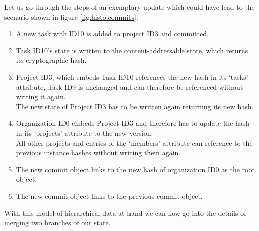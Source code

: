 Let us go through the steps of an exemplary update which could have lead to the scenario shown in figure \ref{fig:histo.commits}:

\begin{enumerate}
\item A new task with ID10 is added to project ID3 and committed.
\item Task ID10's state is written to the content-addressable store, which returns its cryptographic hash.
\item Project ID3, which embeds Task ID10 references the new hash in its `tasks' attribute, Task ID9 is unchanged and can therefore be referenced without writing it again.\\
The new state of Project ID3 has to be written again returning its new hash.
\item Organization ID0 embeds Project ID3 and therefore has to update the hash in its `projects' attribute to the new version.\\
All other projects and entries of the `members' attribute can reference to the previous instance hashes without writing them again.
\item The new commit object links to the new hash of organization ID0 as the root object.
\item The new commit object links to the previous commit object.
\end{enumerate}

With this model of hierarchical data at hand we can now go into the details of merging two branches of our state.
